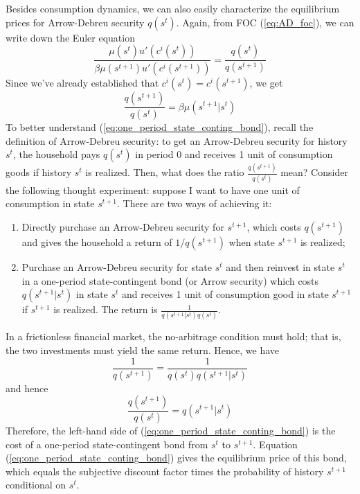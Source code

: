 \documentclass[12pt]{article}
\begin{document}
Besides consumption dynamics, we can also easily characterize the equilibrium prices for Arrow-Debreu security $q(s^t)$. Again, from FOC (\ref{eq:AD_foc}), we can write down the Euler equation
\begin{equation}
	\frac{\mu(s^t) u'(c^i(s^t))}{\beta \mu(s^{t+1}) u'(c^i(s^{t+1}))} = \frac{q(s^t)}{q(s^{t+1})}
\end{equation}
Since we've already established that $c^i(s^t) = c^i(s^{t+1})$, we get 
\begin{equation} \label{eq:one_period_state_conting_bond}
	\frac{q(s^{t+1})}{q(s^t)} = \beta \mu(s^{t+1}|s^t)
\end{equation}
To better understand (\ref{eq:one_period_state_conting_bond}), recall the definition of Arrow-Debreu security: to get an Arrow-Debreu security for history $s^t$, the household pays $q(s^t)$ in period 0 and receives 1 unit of consumption goods if history $s^t$ is realized. Then, what does the ratio $\frac{q(s^{t+1})}{q(s^t)}$ mean? Consider the following thought experiment: suppose I want to have one unit of consumption in state $s^{t+1}$. There are two ways of achieving it:
\begin{enumerate}
	\item Directly purchase an Arrow-Debreu security for $s^{t+1}$, which costs $q(s^{t+1})$ and gives the household a return of $1/q(s^{t+1})$ when state $s^{t+1}$ is realized;
	\item Purchase an Arrow-Debreu security for state $s^t$ and then reinvest in state $s^t$ in a one-period state-contingent bond (or Arrow security) which costs $q(s^{t+1}|s^t)$ in state $s^t$ and receives 1 unit of consumption good in state $s^{t+1}$ if $s^{t+1}$ is realized. The return is $\frac{1}{q(s^{t+1}|s^t) q(s^t)}$.
\end{enumerate} 
In a frictionless financial market, the no-arbitrage condition must hold; that is, the two investments must yield the same return. Hence, we have
\[\frac{1}{q(s^{t+1})} = \frac{1}{q(s^t) q(s^{t+1}|s^t)}\]
and hence
\begin{equation}
	\frac{q(s^{t+1})}{q(s^t)} = q(s^{t+1}|s^t)
\end{equation}
Therefore, the left-hand side of (\ref{eq:one_period_state_conting_bond}) is the cost of a one-period state-contingent bond from $s^t$ to $s^{t+1}$. Equation (\ref{eq:one_period_state_conting_bond}) gives the equilibrium price of this bond, which equals the subjective discount factor times the probability of history $s^{t+1}$ conditional on $s^t$.
\end{document}
